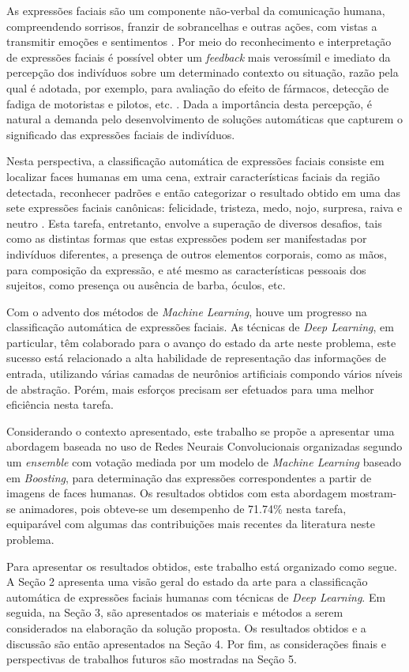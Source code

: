 As expressões faciais são um componente não-verbal da comunicação humana, compreendendo sorrisos, franzir de sobrancelhas e outras ações, com vistas a transmitir emoções e sentimentos \cite{Ekman1971}. Por meio do reconhecimento e interpretação de expressões faciais é possível obter um \emph{feedback} mais verossímil e imediato da percepção dos indivíduos sobre um determinado contexto ou situação, razão pela qual é adotada, por exemplo, para avaliação do efeito de fármacos, detecção de fadiga de motoristas e pilotos, etc. \cite{Fasel2003}. Dada a importância desta percepção, é natural a demanda pelo desenvolvimento de soluções automáticas que capturem o significado das expressões faciais de indivíduos.

Nesta perspectiva, a classificação automática de expressões faciais consiste em localizar faces humanas em uma cena, extrair características faciais da região detectada, reconhecer padrões e então categorizar o resultado obtido em uma das sete expressões faciais canônicas: felicidade, tristeza, medo, nojo, surpresa, raiva e neutro \cite{Pantic2009fea}. Esta tarefa, entretanto, envolve a superação de diversos desafios, tais como as distintas formas que estas expressões podem ser manifestadas por indivíduos diferentes, a presença de outros elementos corporais, como as mãos, para composição da expressão, e até mesmo as características pessoais dos sujeitos, como presença ou ausência de barba, óculos, etc.

Com o advento dos métodos de \emph{Machine Learning}, houve um progresso na classificação automática de expressões faciais. As técnicas de \emph{Deep Learning}, em particular, têm colaborado para o avanço do estado da arte neste problema, este sucesso está relacionado a alta habilidade de representação das informações de entrada, utilizando várias camadas de neurônios artificiais compondo vários níveis de abstração\cite{lecun2015deep}. Porém, mais esforços precisam ser efetuados para uma melhor eficiência nesta tarefa.

Considerando o contexto apresentado, este trabalho se propõe a apresentar uma abordagem baseada no uso de Redes Neurais Convolucionais organizadas segundo um \emph{ensemble} com votação mediada por um modelo de \emph{Machine Learning} baseado em \emph{Boosting}, para determinação das expressões correspondentes a partir de imagens de faces humanas. Os resultados obtidos com esta abordagem mostram-se animadores, pois obteve-se um desempenho de 71.74\% nesta tarefa, equiparável com algumas das contribuições mais recentes da literatura neste problema.

Para apresentar os resultados obtidos, este trabalho está organizado como segue. A Seção 2 apresenta uma visão geral do estado da arte para a classificação automática de expressões faciais humanas com técnicas de \emph{Deep Learning}. Em seguida, na Seção 3, são apresentados os materiais e métodos a serem considerados na elaboração da solução proposta. Os resultados obtidos e a discussão são então apresentados na Seção 4. Por fim, as considerações finais e perspectivas de trabalhos futuros são mostradas na Seção 5.
